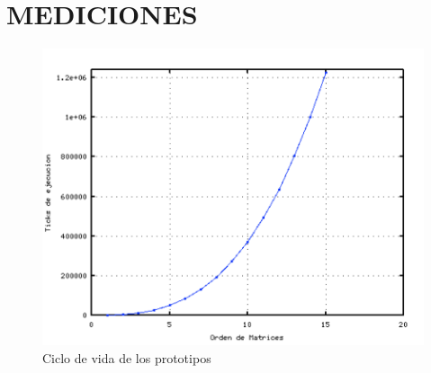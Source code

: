 \documentclass[conference]{IEEEtran}
\newcommand{\ScaleA}{1.0} %
\begin{document}
\section{MEDICIONES} \label{sec:improvements}

\begin{figure}[t] 
  \centerline{\includegraphics[width=\ScaleA\columnwidth]{figures_sources/calculomatriz}}%
    \caption{Ciclo de vida de los prototipos}
    \label{fig:pro3enc} 
\end{figure}
\end{document}
